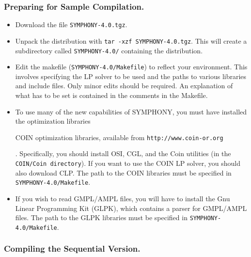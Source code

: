 \subsubsection{Preparing for Sample Compilation.}

\begin{itemize}

        \item Download the file {\tt SYMPHONY-4.0.tgz}.

        \item Unpack the distribution with {\tt tar -xzf
        SYMPHONY-4.0.tgz}. This will create a subdirectory called
        {\tt SYMPHONY-4.0/} containing the distribution.
        
        \item Edit the makefile ({\tt SYMPHONY-4.0/Makefile}) to reflect your
              environment. This involves specifying the LP solver to be used
              and the paths to various libraries and include files. Only minor
              edits should be required. An explanation of what has to be set
              is contained in the comments in the Makefile. 

        \item To use many of the new capabilities of SYMPHONY, you must have
	      installed the
	      optimization libraries \begin{latexonly} COIN optimization
	      libraries, available from \texttt{http://www.coin-or.org}
	      \end{latexonly}.  Specifically, you should install OSI, CGL, and
	      the Coin utilities (in the \texttt{COIN/Coin directory}). If you
	      want to use the COIN LP solver, you should also download CLP.
	      The path to the COIN libraries must be specified in
	      \texttt{SYMPHONY-4.0/Makefile}.

        \item If you wish to read GMPL/AMPL files, you will have to install
	      the Gnu Linear Programming Kit (GLPK), which contains a parser
	      for GMPL/AMPL files. The path to the GLPK libraries must be
	      specified in \texttt{SYMPHONY-4.0/Makefile}.

\end{itemize}
        
\subsubsection{Compiling the Sequential Version.}

